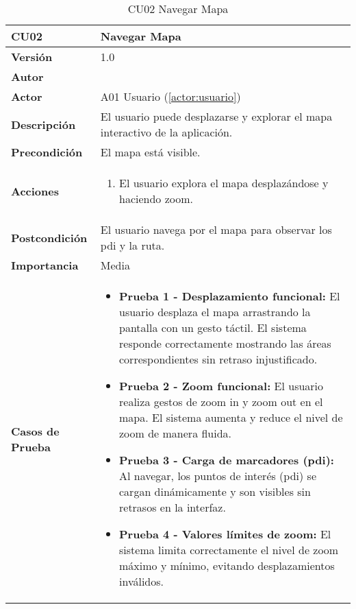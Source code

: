 \begin{table}[H]
	\centering
	\begin{tabularx}{\linewidth}{ p{} p{} }
		\toprule
		\textbf{CU02}    & \textbf{Navegar Mapa} \\
		\toprule
		\textbf{Versión}              & 1.0    \\
		\textbf{Autor}                & \autor \\
		\textbf{Actor}                & A01 Usuario (\ref{actor:usuario}) \\
		\textbf{Descripción}          & El usuario puede desplazarse y explorar el mapa interactivo de la aplicación. \\
		\textbf{Precondición}         & El mapa está visible. \\
		\textbf{Acciones}             &
		\begin{enumerate}
			\def\labelenumi{\arabic{enumi}.}
			\tightlist
			\item El usuario explora el mapa desplazándose y haciendo zoom.
		\end{enumerate}\\
		\textbf{Postcondición}        & El usuario navega por el mapa para observar los \acrshort{pdi} y la ruta. \\
		\textbf{Importancia}          & Media \\
		\textbf{Casos de Prueba}      &
		\begin{itemize}
			\item \textbf{Prueba 1 - Desplazamiento funcional:} El usuario desplaza el mapa arrastrando la pantalla con un gesto táctil. El sistema responde correctamente mostrando las áreas correspondientes sin retraso injustificado.
			\vspace{2pt}
			\item \textbf{Prueba 2 - Zoom funcional:} El usuario realiza gestos de zoom in y zoom out en el mapa. El sistema aumenta y reduce el nivel de zoom de manera fluida.
			\vspace{2pt}
			\item \textbf{Prueba 3 - Carga de marcadores (\acrshort{pdi}):} Al navegar, los puntos de interés (\acrshort{pdi}) se cargan dinámicamente y son visibles sin retrasos en la interfaz.
			\vspace{2pt}
			\item \textbf{Prueba 4 - Valores límites de zoom:} El sistema limita correctamente el nivel de zoom máximo y mínimo, evitando desplazamientos inválidos.
		\end{itemize} \\
		\bottomrule
	\end{tabularx}
	\caption{CU02 Navegar Mapa}
	\label{cu:navegar-mapa}
\end{table}



